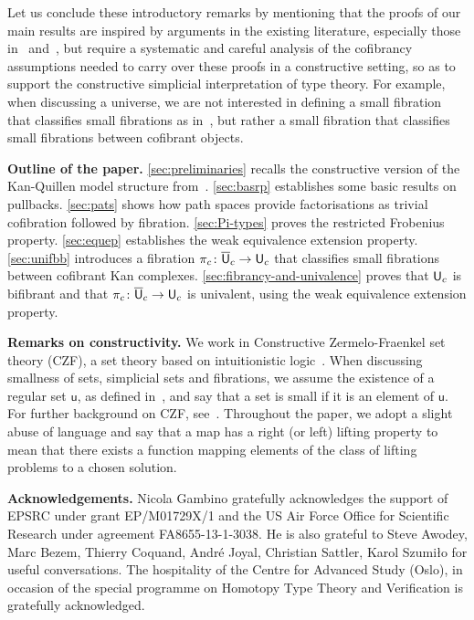 \documentclass[reqno,10pt,a4paper,oneside,draft]{amsart}
\begin{document}
Let us conclude these introductory remarks by mentioning that the proofs of our main results are inspired by arguments  in the existing literature, especially those in~\cite{voevodsky-simplicial-model} and~\cite{gambino2017frobenius}, but require a systematic
and careful analysis of the cofibrancy assumptions needed to carry over these proofs in a constructive
setting, so as to support the constructive simplicial interpretation of type theory. For example,
when discussing a universe, we are not interested in defining a small fibration that classifies small fibrations as in~\cite{voevodsky-simplicial-model}, but
rather a small fibration that classifies small fibrations between cofibrant objects. 




\noindent 
\textbf{Outline of the paper.} \cref{sec:preliminaries} recalls the constructive version of the 
Kan-Quillen model structure from~\cite{henry2019qms}. \cref{sec:basrp} establishes some basic results on pullbacks. \cref{sec:pats} shows how path spaces provide factorisations
as trivial cofibration followed by fibration. \cref{sec:Pi-types} proves the restricted Frobenius property. \cref{sec:equep}
establishes the weak equivalence extension property.
\cref{sec:unifbb} introduces a fibration $\pi_c \colon \overline{\mathsf{U}}_c \to \mathsf{U}_c$ that classifies small fibrations
between cofibrant Kan complexes. \cref{sec:fibrancy-and-univalence} proves that $\mathsf{U}_c$ is bifibrant and that $\pi_c \colon \overline{\mathsf{U}}_c \to \mathsf{U}_c$ is univalent, using the weak equivalence extension property.




\noindent
\textbf{Remarks on constructivity.} We work in  Constructive Zermelo-Fraenkel set theory (CZF),
a set theory based on intuitionistic logic~\cite{AczelP:typtic-I}. When discussing smallness of sets,
simplicial sets and fibrations, we assume the existence of a regular set $\mathsf{u}$, as defined 
in~\cite{AczelP:typtic-II}, and say that a set is small if it is an element of $\mathsf{u}$.
For further background on CZF, see~\cite{AczelP:notcst}. 
Throughout the paper, we adopt a slight abuse of language and say that a map has a right (or left) lifting property to mean that there exists a function mapping elements of the class of lifting problems to a chosen solution. 




\noindent 
\textbf{Acknowledgements.} Nicola Gambino gratefully acknowledges the support of
EPSRC under grant EP/M01729X/1 and the US Air Force Office for Scientific Research under 
agreement FA8655-13-1-3038. 
He is also grateful to Steve Awodey, Marc Bezem, Thierry Coquand, Andr\'e Joyal, Christian Sattler, Karol Szumi{\l}o  for useful conversations. The hospitality of the Centre for Advanced Study (Oslo), in occasion of the
special programme on Homotopy Type Theory and Verification is gratefully acknowledged.
\end{document}
